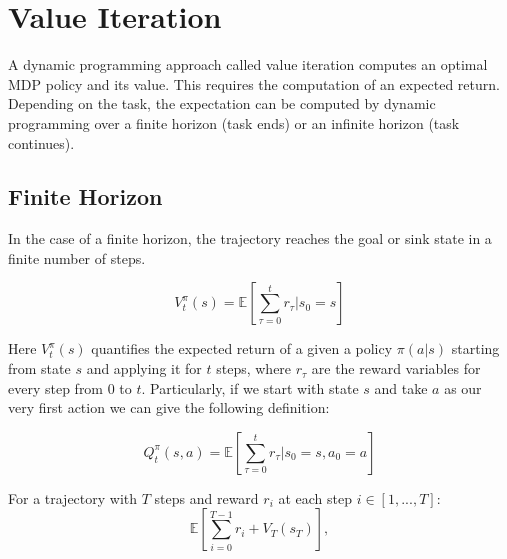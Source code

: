 \documentclass{article}
\begin{document}

\section{Value Iteration}

A dynamic programming approach called value iteration computes an optimal MDP policy and its value. This requires the computation of an expected return. Depending on the task, the expectation can be computed by dynamic programming over a finite horizon (task ends) or an infinite horizon (task continues).

\subsection{Finite Horizon}

In the case of a finite horizon, the trajectory reaches the goal or sink state in a finite number of steps.

\begin{defn}
\[
V^\pi_t(s) = \mathbb{E} \left[ \sum_{\tau=0}^{t}r_\tau|s_0=s \right]
\]
\end{defn}
Here $V^\pi_t(s)$ quantifies the expected return of a given a policy $\pi(a|s)$ starting from state $s$ and applying it for $t$ steps, where $r_\tau$ are the reward variables for every step from $0$ to $t$. Particularly, if we start with state $s$ and take $a$ as our very first action we can give the following definition:

\begin{defn}
\[
Q^\pi_t(s, a) = \mathbb{E} \left[ \sum_{\tau=0}^{t}r_\tau|s_0=s,a_0=a \right]
\]
\end{defn}

\begin{defn}
For a trajectory with $T$ steps and reward $r_{i}$ at each step $i \in [1,...,T]$:
\[
\mathbb{E}\left[\sum_{i=0}^{T-1}r_i + V_T(s_T)\right], 
\]
\end{defn}
\end{document}
